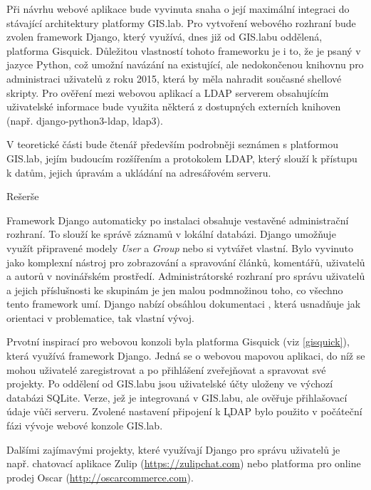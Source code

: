 
Při návrhu webové aplikace bude vyvinuta snaha o její maximální
integraci do stávající architektury platformy GIS.lab. Pro vytvoření
webového rozhraní bude zvolen framework Django, který využívá, dnes již
od GIS.labu oddělená, platforma Gisquick. Důležitou vlastností tohoto
frameworku je i to, že je psaný v jazyce Python, což umožní navázání
na existující, ale nedokončenou knihovnu pro administraci uživatelů z
roku 2015, která by měla nahradit současné shellové skripty. Pro
ověření mezi webovou aplikací a LDAP serverem obsahujícím uživatelské
informace bude využita některá z dostupných externích knihoven
(např. django-python3-ldap, ldap3).

V teoretické části bude čtenář především podrobněji seznámen s
platformou GIS.lab, jejím budoucím rozšířením a protokolem LDAP, 
který slouží k přístupu k datům, jejich úpravám a ukládání na 
adresářovém serveru.

\newpage
Rešerše

Framework Django automaticky po instalaci obsahuje vestavěné administrační rozhraní. To slouží ke správě záznamů v lokální databázi. Django umožňuje využít připravené modely \textit{User} a \textit{Group} nebo si vytvářet vlastní. Bylo vyvinuto jako komplexní nástroj pro zobrazování a spravování článků, komentářů, uživatelů a autorů v novinářském prostředí. Administrátorské rozhraní pro správu uživatelů a jejich příslušnosti ke skupinám je jen malou podmnožinou toho, co všechno tento framework umí. Django nabízí obsáhlou dokumentaci \cite{django-doc}, která usnadňuje jak orientaci v problematice, tak vlastní vývoj.

Prvotní inspirací pro webovou konzoli byla platforma Gisquick (viz \ref{gisquick}), která využívá framework Django. Jedná se o webovou mapovou aplikaci, do níž se mohou uživatelé zaregistrovat a po přihlášení zveřejňovat a spravovat své projekty. Po oddělení od GIS.labu jsou uživatelské účty uloženy ve výchozí databázi SQLite. Verze, jež je integrovaná v GIS.labu, ale ověřuje přihlašovací údaje vůči  serveru. Zvolené nastavení připojení k \k{LDAP} bylo použito v počáteční fázi vývoje webové konzole GIS.lab.

Dalšími zajímavými projekty, které využívají Django pro správu uživatelů je např. chatovací aplikace Zulip (\href{https://zulipchat.com}{https://zulipchat.com}) nebo platforma pro online prodej Oscar (\href{http://oscarcommerce.com}{http://oscarcommerce.com}).

